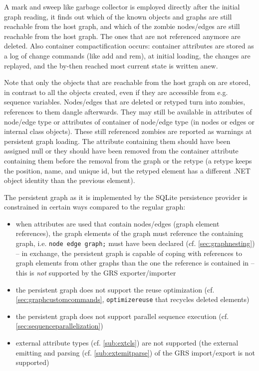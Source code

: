 A mark and sweep like garbage collector is employed directly after the initial graph reading, it finds out which of the known objects and graphs are still reachable from the host graph, and which of the zombie nodes/edges are still reachable from the host graph.
The ones that are not referenced anymore are deleted.
Also container compactification occurs: container attributes are stored as a log of change commands (like add and rem), at initial loading, the changes are replayed, and the by-then reached most current state is written anew.

Note that only the objects that are reachable from the host graph on are stored, in contrast to all the objects created, even if they are accessible from e.g. sequence variables.
Nodes/edges that are deleted or retyped turn into zombies, references to them dangle afterwards.
They may still be available in attributes of node/edge type or attributes of container of node/edge type (in nodes or edges or internal class objects).
These still referenced zombies are reported as warnings at persistent graph loading.
The attribute containing them should have been assigned null or they should have been removed from the container attribute containing them before the removal from the graph or the retype (a retype keeps the position, name, and unique id, but the retyped element has a different .NET object identity than the previous element).

The persistent graph as it is implemented by the SQLite persistence provider is constrained in certain ways compared to the regular graph:
\begin{itemize}
	\item when attributes are used that contain nodes/edges (graph element references), the graph elements of the graph must reference the containing graph, i.e. \texttt{node edge graph;} must have been declared (cf. \ref{sec:graphnesting}) -- in exchange, the persistent graph is capable of coping with references to graph elements from other graphs than the one the reference is contained in -- this is \emph{not} supported by the GRS exporter/importer
	\item the persistent graph does not support the reuse optimization (cf. \ref{sec:graphcustomcommands}, \texttt{optimizereuse} that recycles deleted elements)
	\item the persistent graph does not support parallel sequence execution (cf. \ref{sec:sequenceparallelization})
	\item external attribute types (cf. \ref{sub:extcls}) are not supported (the external emitting and parsing (cf. \ref{sub:extemitparse}) of the GRS import/export is not supported)
\end{itemize}

